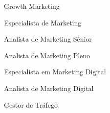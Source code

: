 \begin{commentA}
Growth Marketing
\end{commentA}
\begin{commentB}
Especialista de Marketing
\end{commentB}
\begin{commentC}
Analista de Marketing Sênior
\end{commentC}
\begin{commentD}
Analista de Marketing Pleno
\end{commentD}
\begin{commentE}
Especialista em Marketing Digital
\end{commentE}
\begin{commentF}
Analista de Marketing Digital
\end{commentF}
\begin{commentG}
Gestor de Tráfego
\end{commentG}
\begin{commentH}
\end{commentH}
\begin{commentI}
\end{commentI}
